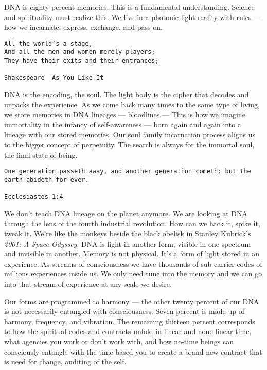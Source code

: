 DNA is eighty percent memories. This is a fundamental understanding.
Science and spirituality must realize this. We live in a photonic light
reality with rules --- how we incarnate, express, exchange, and pass on.

\begin{verbatim}
All the world’s a stage,
And all the men and women merely players;
They have their exits and their entrances;

Shakespeare  As You Like It
\end{verbatim}

DNA is the encoding, the soul. The light body is the cipher that decodes
and unpacks the experience. As we come back many times to the same type
of living, we store memories in DNA lineages --- bloodlines --- This is
how we imagine immortality in the infancy of self-awareness --- born
again and again into a lineage with our stored memories. Our soul family
incarnation process aligns us to the bigger concept of perpetuity. The
search is always for the immortal soul, the final state of being.

\begin{verbatim}
One generation passeth away, and another generation cometh: but the earth abideth for ever.

Ecclesiastes 1:4
\end{verbatim}

We don't teach DNA lineage on the planet anymore. We are looking at DNA
through the lens of the fourth industrial revolution. How can we hack
it, spike it, tweak it. We're like the monkeys beside the black obelisk
in Stanley Kubrick's \emph{2001: A Space Odyssey}. DNA is light in
another form, visible in one spectrum and invisible in another. Memory
is not physical. It's a form of light stored in an experience. ​​​​​​​As
streams of consciousness we have thousands of sub-carrier codes of
millions experiences inside us. We only need tune into the memory and we
can go into that stream of experience at any scale we desire.

Our forms are programmed to harmony --- the other twenty percent of our
DNA is not necessarily entangled with consciousness. Seven percent is
made up of harmony, frequency, and vibration. The remaining thirteen
percent corresponds to how the spiritual codes and contracts unfold in
linear and none-linear time, what agencies you work or don't work with,
and how no-time beings can consciously entangle with the time based you
to create a brand new contract that is need for change, auditing of the
self.

